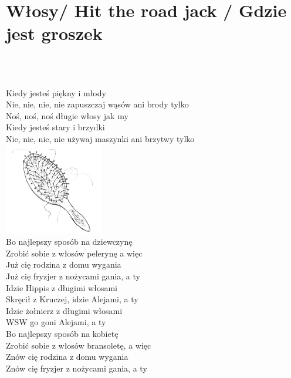 \documentclass[a5paper, 10pt]{book}
\begin{document}
\section{Włosy/ Hit the road jack / Gdzie jest groszek}\textcolor{lightgray}{\textit{}}\\~\\
\begin{minipage}[t]{0.9\textwidth}
  Kiedy jesteś piękny i młody\\
  Nie, nie, nie, nie zapuszczaj wąsów ani brody tylko\\

  \hspace*{5mm}Noś, noś, noś długie włosy jak my\\

  Kiedy jesteś stary i brzydki\\
  Nie, nie, nie, nie używaj maszynki ani brzytwy tylko\\

  \includegraphics[height=4cm, right]{wlosy.png}\vspace*{-4.1cm}\\
  Bo najlepszy sposób na dziewczynę\\
  Zrobić sobie z włosów pelerynę a więc\\

  Już cię rodzina z domu wygania\\
  Już cię fryzjer z nożycami gania, a ty\\

  Idzie Hippis z długimi włosami\\
  Skręcił z Kruczej, idzie Alejami, a ty\\

  Idzie żołnierz z długimi włosami\\
  WSW go goni Alejami, a ty\\

  Bo najlepszy sposób na kobietę\\
  Zrobić sobie z włosów bransoletę, a więc\\

  Znów cię rodzina z domu wygania\\
  Znów cię fryzjer z nożycami gania, a ty\\


\end{minipage}
\end{document}
